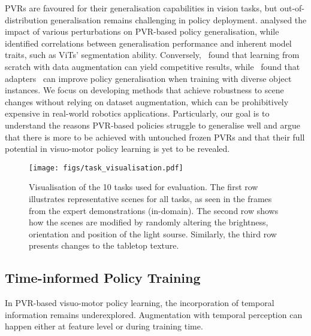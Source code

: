 PVRs are favoured for their generalisation capabilities in vision tasks, but out-of-distribution generalisation remains challenging in policy deployment. 
\cite{10611331} analysed the impact of various perturbations on PVR-based policy generalisation, while~\cite{burns2024what} identified correlations between generalisation performance and inherent model traits, such as ViTs' segmentation ability.
Conversely,~\cite{Hansen2022pre} found that learning from scratch with data augmentation can yield competitive results, while~\cite{spawnet} found that adapters~\cite{houlsby2019parameter} can improve policy generalisation when training with diverse object instances. 
We focus on developing methods that achieve robustness to scene changes without relying on dataset augmentation, which can be prohibitively expensive in real-world robotics applications.
Particularly, our goal is to understand the reasons PVR-based policies struggle to generalise well and argue that there is more to be achieved with untouched frozen PVRs and that their full potential in visuo-motor policy learning is yet to be revealed. 
\begin{figure*}[t]
\begin{center}
\texttt{[image: figs/task\_visualisation.pdf]} \\
\vspace{-10pt}
\caption{Visualisation of the 10 tasks used for evaluation. The first row illustrates representative scenes for all tasks, as seen in the frames from the expert demonstrations (in-domain). The second row shows how the scenes are modified by randomly altering the brightness, orientation and position of the light sourse. Similarly, the third row presents changes to the tabletop texture.}
\label{fig:task_vis}
\end{center}
\vspace{-15pt}
\end{figure*}

\subsection{Time-informed Policy Training} 
In PVR-based visuo-motor policy learning, the incorporation of temporal information remains underexplored. Augmentation with temporal perception can happen either at feature level or during training time. 

